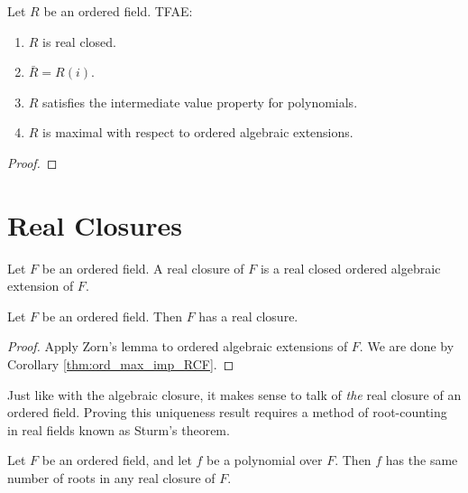 \begin{theorem}
  \label{thm:RCF_tfae}
  Let $R$ be an ordered field. TFAE:
  \begin{enumerate}
    \item $R$ is real closed.
    \item $\bar{R}=R(i)$.
    \item $R$ satisfies the intermediate value property for polynomials.
    \item $R$ is maximal with respect to ordered algebraic extensions.
  \end{enumerate}
\end{theorem}
\begin{proof}
\end{proof}

\section{Real Closures}

\begin{definition}
  \label{def:real_closure}
  \leanok
  Let $F$ be an ordered field. A real closure of $F$ is a real closed ordered algebraic extension of $F$.
\end{definition}

\begin{lemma}
  \label{lem:real_closure_exists}
  Let $F$ be an ordered field. Then $F$ has a real closure.
\end{lemma}
\begin{proof}
  Apply Zorn's lemma to ordered algebraic extensions of $F$. We are done by Corollary \ref{thm:ord_max_imp_RCF}.
\end{proof}

Just like with the algebraic closure, it makes sense to talk of \textit{the} real closure of an ordered field. Proving this uniqueness result requires a method of root-counting in real fields known as Sturm's theorem.

\begin{theorem}
  \label{thm:Sturm}
  Let $F$ be an ordered field, and let $f$ be a polynomial over $F$. Then $f$ has the same number of roots in any real closure of $F$.
\end{theorem}

